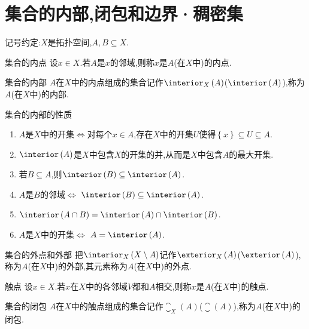 \section{集合的内部,闭包和边界·稠密集}

记号约定:$X$是拓扑空间,$A,B\subseteq X$.

\begin{definition}{集合的内点}{}
	设$x\in X$.若$A$是$x$的邻域,则称$x$是$A$(在$X$中)的内点.
\end{definition}

\begin{definition}{集合的内部}{}
	$A$在$X$中的内点组成的集合记作$\interior_{X}\left(A\right)$($\interior\left(A\right)$),称为$A$(在$X$中)的内部.
\end{definition}

\begin{proposition}{集合的内部的性质}{}
	\begin{enumerate}
		\item $A$是$X$中的开集$\iff$对每个$x\in A$,存在$X$中的开集$U$使得$\left\{x\right\}\subseteq U\subseteq A$.
		\item $\interior\left(A\right)$是$X$中包含$X$的开集的并,从而是$X$中包含$A$的最大开集.
		\item 若$B\subseteq A$,则$\interior\left(B\right)\subseteq\interior\left(A\right)$.
		\item $A$是$B$的邻域$\iff$ $\interior\left(B\right)\subseteq\interior\left(A\right)$.
		\item $\interior\left(A\cap B\right)=\interior\left(A\right)\cap\interior\left(B\right)$.
		\item $A$是$X$中的开集$\iff$ $A=\interior\left(A\right)$.
	\end{enumerate}
\end{proposition}

\begin{definition}{集合的外点和外部}{}
	把$\interior_{X}\left(X\setminus A\right)$记作$\exterior_{X}\left(A\right)$($\exterior\left(A\right)$),称为$A$(在$X$中)的外部,其元素称为$A$(在$X$中)的外点.
\end{definition}

\begin{definition}{触点}{}
	设$x\in X$.若$x$在$X$中的各邻域$V$都和$A$相交,则称$x$是$A$(在$X$中)的触点.
\end{definition}

\begin{definition}{集合的闭包}{}
	$A$在$X$中的触点组成的集合记作$\closure_{X}\left(A\right)$($\closure\left(A\right)$),称为$A$(在$X$中)的闭包.
\end{definition}

